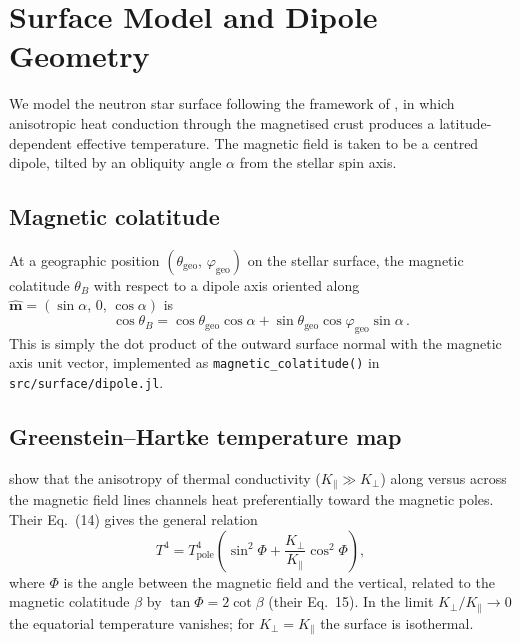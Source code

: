 \section{Surface Model and Dipole Geometry}
\label{sec:surface_model}

We model the neutron star surface following the framework of
\citet{greenstein_hartke_1983}, in which anisotropic heat conduction through
the magnetised crust produces a latitude-dependent effective temperature.
The magnetic field is taken to be a centred dipole, tilted by an obliquity
angle $\alpha$ from the stellar spin axis.

\subsection{Magnetic colatitude}

At a geographic position $(\theta_{\mathrm{geo}},\,\varphi_{\mathrm{geo}})$
on the stellar surface, the magnetic colatitude $\theta_B$ with respect to
a dipole axis oriented along
$\hat{\boldsymbol{m}} = (\sin\alpha,\,0,\,\cos\alpha)$ is
\begin{equation}
  \cos\theta_B = \cos\theta_{\mathrm{geo}}\cos\alpha
    + \sin\theta_{\mathrm{geo}}\cos\varphi_{\mathrm{geo}}\sin\alpha\,.
  \label{eq:cos_thetaB}
\end{equation}
This is simply the dot product of the outward surface normal with the
magnetic axis unit vector, implemented as \texttt{magnetic\_colatitude()} in
\texttt{src/surface/dipole.jl}.

\subsection{Greenstein--Hartke temperature map}

\citet{greenstein_hartke_1983} show that the anisotropy of thermal
conductivity ($K_\parallel \gg K_\perp$) along versus across the magnetic
field lines channels heat preferentially toward the magnetic poles.  Their
Eq.~(14) gives the general relation
\begin{equation}
  T^{4} = T_{\mathrm{pole}}^{4}
    \!\left(\sin^{2}\Phi + \frac{K_\perp}{K_\parallel}\cos^{2}\Phi\right),
  \label{eq:GH_exact}
\end{equation}
where $\Phi$ is the angle between the magnetic field and the vertical,
related to the magnetic colatitude $\beta$ by
$\tan\Phi = 2\cot\beta$ (their Eq.~15).  In the limit
$K_\perp/K_\parallel \to 0$ the equatorial temperature vanishes; for
$K_\perp = K_\parallel$ the surface is isothermal.

